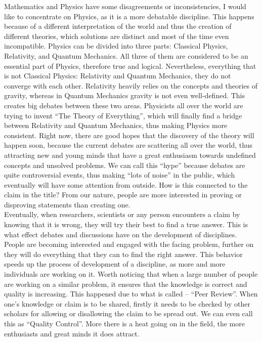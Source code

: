 \documentclass[12pt,a4paper]{article}
\begin{document}
Mathematics and Physics have some disagreements or inconsistencies, I would like to concentrate on Physics, as it is a more debatable discipline. This happens because of a different interpretation of the world and thus the creation of different theories, which solutions are distinct and most of the time even incompatible. Physics can be divided into three parts: Classical Physics, Relativity, and Quantum Mechanics\cite{bop}. All three of them are considered to be an essential part of Physics, therefore true and logical. Nevertheless, everything that is not Classical Physics: Relativity and Quantum Mechanics, they do not converge with each other. Relativity heavily relies on the concepts and theories of gravity, whereas in Quantum Mechanics gravity is not even well-defined. This creates big debates between these two areas. Physicists all over the world are trying to invent “The Theory of Everything”\cite{toe}, which will finally find a bridge between Relativity and Quantum Mechanics, thus making Physics more consistent. Right now, there are good hopes that the discovery of the theory will happen soon, because the current debates are scattering all over the world, thus attracting new and young minds that have a great enthusiasm towards undefined concepts and unsolved problems. We can call this ``hype'' because debates are quite controversial events, thus making “lots of noise” in the public, which eventually will have some attention from outside. How is this connected to the claim in the title? From our nature, people are more interested in proving or disproving statements than creating one. \\

Eventually, when researchers, scientists or any person encounters a claim by knowing that it is wrong, they will try their best to find a true answer. This is what effect debates and discussions have on the development of disciplines. People are becoming interested and engaged with the facing problem, further on they will do everything that they can to find the right answer. This behavior speeds up the process of development of a discipline, as more and more individuals are working on it. Worth noticing that when a large number of people are working on a similar problem, it ensures that the knowledge is correct and quality is increasing. This happened due to what is called – “Peer Review”\cite{tok}. When one’s knowledge or claim is to be shared, firstly it needs to be checked by other scholars for allowing or disallowing the claim to be spread out. We can even call this as “Quality Control”. More there is a heat going on in the field, the more enthusiasts and great minds it does attract. \\
\end{document}
